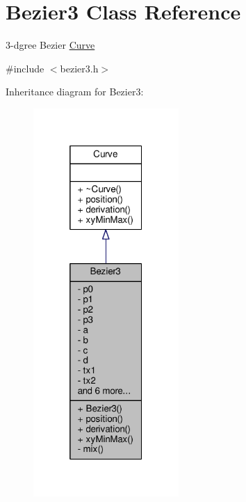 \hypertarget{classBezier3}{}\section{Bezier3 Class Reference}
\label{classBezier3}


3-\/dgree Bezier \hyperlink{classCurve}{Curve}  




{\ttfamily \#include $<$bezier3.\+h$>$}



Inheritance diagram for Bezier3\+:\nopagebreak
\begin{figure}[H]
\begin{center}
\leavevmode
\includegraphics[width=157pt]{classBezier3__inherit__graph}
\end{center}
\end{figure}



